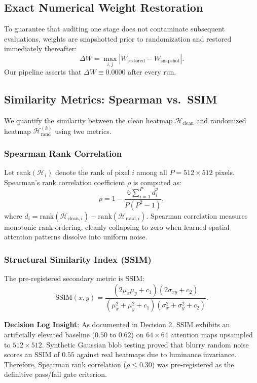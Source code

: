 \documentclass[journal,10pt,twocolumn]{IEEEtran}
\begin{document}
\subsection{Exact Numerical Weight Restoration}
To guarantee that auditing one stage does not contaminate subsequent evaluations, weights are snapshotted prior to randomization and restored immediately thereafter:
\begin{equation}
    \Delta W = \max_{i,j} | W_{\text{restored}} - W_{\text{snapshot}} |.
\end{equation}
Our pipeline asserts that $\Delta W \equiv 0.0000$ after every run.

\subsection{Similarity Metrics: Spearman vs.\ SSIM}
We quantify the similarity between the clean heatmap $\mathcal{H}_{\text{clean}}$ and randomized heatmap $\mathcal{H}_{\text{rand}}^{(k)}$ using two metrics.

\subsubsection{Spearman Rank Correlation}
Let $\text{rank}(\mathcal{H}_i)$ denote the rank of pixel $i$ among all $P = 512 \times 512$ pixels. Spearman's rank correlation coefficient $\rho$ is computed as:
\begin{equation}
    \rho = 1 - \frac{6 \sum_{i=1}^P d_i^2}{P (P^2 - 1)},
\end{equation}
where $d_i = \text{rank}(\mathcal{H}_{\text{clean}, i}) - \text{rank}(\mathcal{H}_{\text{rand}, i})$. Spearman correlation measures monotonic rank ordering, cleanly collapsing to zero when learned spatial attention patterns dissolve into uniform noise.

\subsubsection{Structural Similarity Index (SSIM)}
The pre-registered secondary metric is SSIM:
\begin{equation}
    \text{SSIM}(x, y) = \frac{(2 \mu_x \mu_y + c_1)(2 \sigma_{xy} + c_2)}{(\mu_x^2 + \mu_y^2 + c_1)(\sigma_x^2 + \sigma_y^2 + c_2)}.
\end{equation}

\textbf{Decision Log Insight}: As documented in Decision 2, SSIM exhibits an artificially elevated baseline ($0.50$ to $0.62$) on $64 \times 64$ attention maps upsampled to $512 \times 512$. Synthetic Gaussian blob testing proved that blurry random noise scores an SSIM of $0.55$ against real heatmaps due to luminance invariance. Therefore, Spearman rank correlation ($\rho \le 0.30$) was pre-registered as the definitive pass/fail gate criterion.
\end{document}
